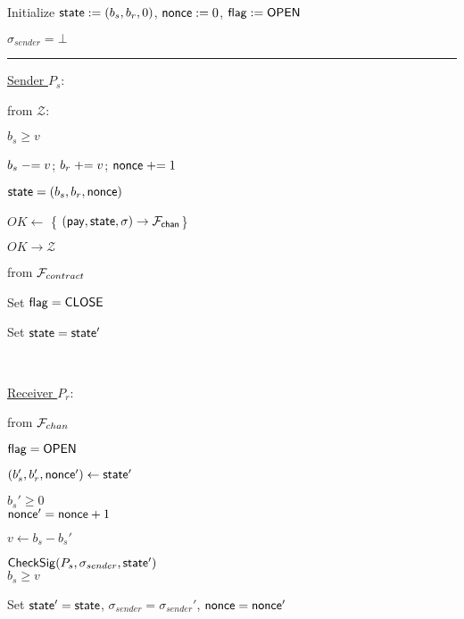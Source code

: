 \begin{bbox}[title={$\Pi_{\msf{pay}} (P_s, P_r, b_s, b_r)$}]

Initialize ${\mathsf {state}} := (b_s, b_r, 0)$, ${\mathsf {nonce}} := 0$, ${\mathsf {flag}} := {\mathsf {OPEN}}$

$\sigma_{sender} = \bot$

\vspace{2mm} \hrule \vspace{2mm}

\underline{Sender $P_s$}:

\OnInput {} from $\mathcal{Z}$:
	\begin{renumerate}
	\item \Require $b_s \geq v$
	\item $b_s \mathrel{-}= v$; $b_r \mathrel{+}= v$; ${\mathsf {nonce}} \mathrel{+}= 1$
	\item ${\mathsf {state}} = (b_s, b_r, {\mathsf {nonce}})$
	\item $OK \leftarrow $ \{ \Send $({\mathsf {pay}}, {\mathsf {state}}, \sigma) \rightarrow \mathcal{F}_{{\mathsf {chan}}}$\}
	\end{renumerate} 
	\quad \Send $OK \rightarrow \mathcal{Z}$	

\OnInput {} from $\mathcal{F}_{contract}$
	\begin{renumerate}
		\item Set ${\mathsf {flag}} = {\mathsf {CLOSE}}$
		\item Set ${\mathsf {state}} = {\mathsf {state}}'$
	\end{renumerate}

\

\underline{Receiver $P_r$}:

\OnInput {} from $\mathcal{F}_{chan}$
	\begin{renumerate}
		\item \Require ${\mathsf {flag}} = {\mathsf {OPEN}}$
		\item $(b_s', b_r', {\mathsf {nonce}}') \leftarrow {\mathsf {state}}'$
		\item \Require $b_s' \geq 0$ \\
			  \Require ${\mathsf {nonce'}} = {\mathsf {nonce}} + 1$

		\item $v \leftarrow b_s - b_s'$
		\item \Require ${\mathsf {CheckSig}}(P_s, \sigma_{sender}, {\mathsf {state}}')$ \\
			  \Require $b_s \geq v$

		\item Set ${\mathsf {state}}' = {\mathsf {state}}$, $\sigma_{sender} = \sigma_{sender}'$, ${\mathsf {nonce}} = {\mathsf {nonce}}'$
	\end{renumerate}


\end{bbox}
